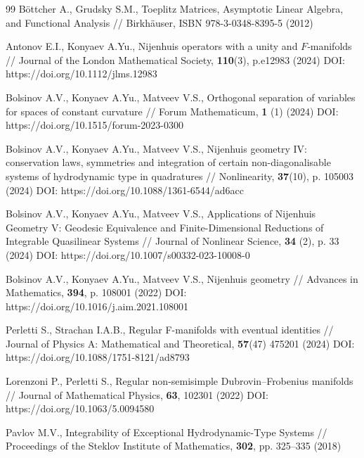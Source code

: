 \documentclass[12pt]{article}
\theoremstyle{remark}
\begin{document}

\begin{thebibliography}{99}
 B\"ottcher A., Grudsky S.M., Toeplitz Matrices, Asymptotic Linear Algebra, and Functional Analysis // Birkh\"auser, ISBN 978-3-0348-8395-5 (2012)

 Antonov E.I., Konyaev A.Yu., Nijenhuis operators with a unity and $F$‐manifolds // Journal of the London Mathematical Society, \textbf{110}(3), p.e12983 (2024) DOI: https://doi.org/10.1112/jlms.12983

 Bolsinov A.V., Konyaev A.Yu., Matveev V.S., Orthogonal separation of variables for spaces of constant curvature //  Forum Mathematicum, \textbf{1} (1) (2024) DOI: https://doi.org/10.1515/forum-2023-0300

 Bolsinov A.V., Konyaev A.Yu., Matveev V.S., Nijenhuis geometry IV: conservation laws, symmetries and integration of certain non-diagonalisable systems of hydrodynamic type in quadratures // Nonlinearity, \textbf{37}(10), p. 105003 (2024) DOI: https://doi.org/10.1088/1361-6544/ad6acc

 Bolsinov A.V., Konyaev A.Yu., Matveev V.S., Applications of Nijenhuis Geometry V: Geodesic Equivalence and Finite-Dimensional Reductions of Integrable Quasilinear Systems // Journal of Nonlinear Science, \textbf{34} (2), p. 33 (2024) DOI: https://doi.org/10.1007/s00332-023-10008-0

 Bolsinov A.V., Konyaev A.Yu., Matveev V.S., Nijenhuis geometry //  Advances in Mathematics, \textbf{394}, p. 108001 (2022) DOI: https://doi.org/10.1016/j.aim.2021.108001

 Perletti S., Strachan I.A.B., Regular F-manifolds with eventual identities // Journal of Physics A: Mathematical and Theoretical, \textbf{57}(47) 475201 (2024) DOI: https://doi.org/10.1088/1751-8121/ad8793

 Lorenzoni P., Perletti S., Regular non-semisimple Dubrovin–Frobenius manifolds // Journal of Mathematical Physics, \textbf{63}, 102301 (2022) DOI: https://doi.org/10.1063/5.0094580

 Pavlov M.V., Integrability of Exceptional Hydrodynamic-Type Systems // Proceedings of the Steklov Institute of Mathematics, \textbf{302}, pp. 325–335 (2018)


\end{thebibliography}
\end{document}
